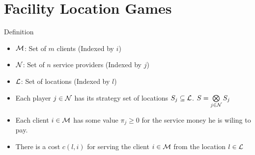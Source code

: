\documentclass[aspectratio=1610]{beamer}
\begin{document}
\section{Facility Location Games}

\begin{frame}{Definition}
	\begin{itemize}
		\item $\mathcal{M}$: Set of $m$ clients (Indexed by $i$)
		\item $\mathcal{N}$: Set of $n$ service providers (Indexed by $j$)
		\item $\mathcal{L}$: Set of locations (Indexed by $l$)\pause
		
        \item Each player $j\in \mathcal{N}$ has its strategy set of locations $S_j\subseteq \mathcal{L}$. $S=\bigotimes\limits_{j\in\mathcal{N}}S_j$\pause
		
        \item Each client $i\in \mathcal{M}$ has some value $\pi_j\geq 0$ for the service money he is wiling to pay.\pause
        
        \item There is a cost $c(l,i)$ for serving the client $i\in\mathcal{M}$ from the location $l\in\mathcal{L}$
	\end{itemize}


\end{frame}
\end{document}
